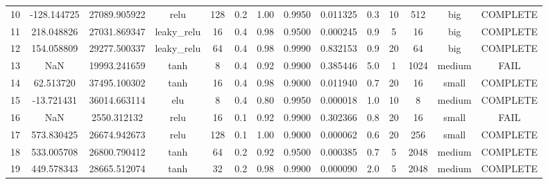 \begin{longtable}{cccccccccccccc}
                       10 &                -128.144725 &                       27089.905922 &            relu &         128 &         0.2 &        1.00 & 0.9950 &       0.011325 &             0.3 &        10 &      512 &       big & COMPLETE \\
                       11 &                 218.048826 &                       27031.869347 &     leaky\_relu &          16 &         0.4 &        0.98 & 0.9500 &       0.000245 &             0.9 &         5 &       16 &       big & COMPLETE \\
                       12 &                 154.058809 &                       29277.500337 &     leaky\_relu &          64 &         0.4 &        0.98 & 0.9990 &       0.832153 &             0.9 &        20 &       64 &       big & COMPLETE \\
                       13 &                        NaN &                       19993.241659 &            tanh &           8 &         0.4 &        0.92 & 0.9900 &       0.385446 &             5.0 &         1 &     1024 &    medium &     FAIL \\
                       14 &                  62.513720 &                       37495.100302 &            tanh &          16 &         0.4 &        0.98 & 0.9000 &       0.011940 &             0.7 &        20 &       16 &     small & COMPLETE \\
                       15 &                 -13.721431 &                       36014.663114 &             elu &           8 &         0.4 &        0.80 & 0.9950 &       0.000018 &             1.0 &        10 &        8 &    medium & COMPLETE \\
                       16 &                        NaN &                        2550.312132 &            relu &          16 &         0.1 &        0.92 & 0.9900 &       0.302366 &             0.8 &        20 &       16 &     small &     FAIL \\
                       17 &                 573.830425 &                       26674.942673 &            relu &         128 &         0.1 &        1.00 & 0.9000 &       0.000062 &             0.6 &        20 &      256 &     small & COMPLETE \\
                       18 &                 533.005708 &                       26800.790412 &            tanh &          64 &         0.2 &        0.92 & 0.9500 &       0.000385 &             0.7 &         5 &     2048 &    medium & COMPLETE \\
                       19 &                 449.578343 &                       28665.512074 &            tanh &          32 &         0.2 &        0.98 & 0.9900 &       0.000090 &             2.0 &         5 &     2048 &    medium & COMPLETE \\

\end{longtable}
